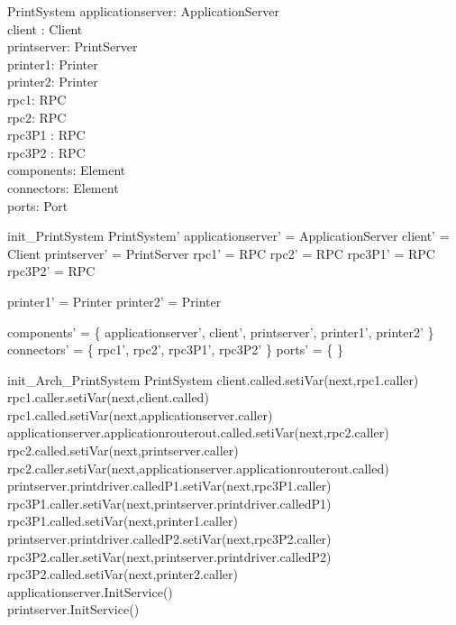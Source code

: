 \begin{schema}{PrintSystem}
applicationserver:  ApplicationServer \\
client :  Client \\
printserver: PrintServer \\
printer1:  Printer \\
printer2:  Printer \\
rpc1: RPC \\
rpc2: RPC \\
rpc3P1 : RPC \\
rpc3P2 : RPC \\
components: \pset Element \\
connectors: \pset Element \\
ports: \pset Port
\end{schema}

\begin{zed}
init\_PrintSystem \sdef \lsch PrintSystem'
                  \bbar applicationserver' = \new ApplicationServer
                  \land client' = \new Client
                  \land printserver' = \new PrintServer
                  \land rpc1' = \new RPC
                  \land rpc2' = \new RPC
                  \land rpc3P1' = \new RPC
                  \land rpc3P2' = \new RPC

                  \land printer1' = \new Printer
                  \land printer2' = \new Printer

                  \land components' = \{ applicationserver', client', printserver', printer1', printer2' \}
                  \land connectors' = \{ rpc1', rpc2', rpc3P1', rpc3P2' \}
                  \land ports' = \{ \}  \rsch
                  \end{zed}

\begin{schema}{init\_Arch\_PrintSystem}
\Delta PrintSystem
\where
client.called.setiVar(next,rpc1.caller) \\
rpc1.caller.setiVar(next,client.called) \\
rpc1.called.setiVar(next,applicationserver.caller) \\
applicationserver.applicationrouterout.called.setiVar(next,rpc2.caller) \\
rpc2.called.setiVar(next,printserver.caller) \\
rpc2.caller.setiVar(next,applicationserver.applicationrouterout.called) \\

printserver.printdriver.calledP1.setiVar(next,rpc3P1.caller) \\
rpc3P1.caller.setiVar(next,printserver.printdriver.calledP1) \\
rpc3P1.called.setiVar(next,printer1.caller) \\

printserver.printdriver.calledP2.setiVar(next,rpc3P2.caller) \\
rpc3P2.caller.setiVar(next,printserver.printdriver.calledP2) \\
rpc3P2.called.setiVar(next,printer2.caller) \\

applicationserver.InitService() \\
printserver.InitService()
\end{schema}
